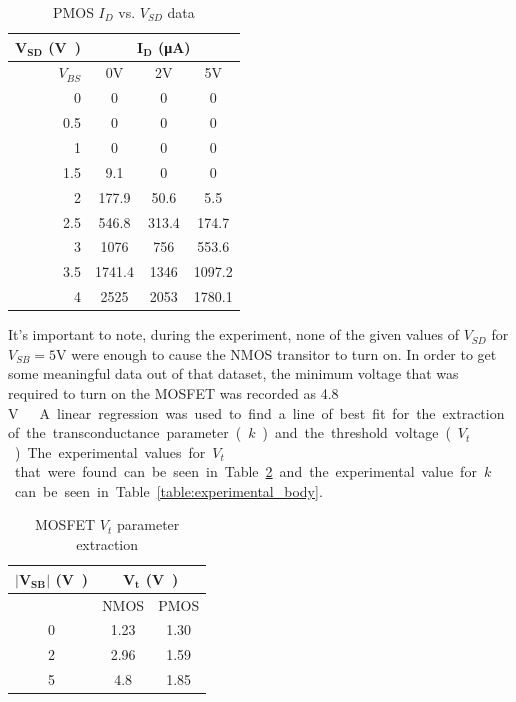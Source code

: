 \documentclass[11pt]{article}
\begin{document}
	\begin{table}[H]
		\centering
		\caption{PMOS \(I_D\) vs. \(V_{SD}\) data}
		\label{table:pmos_vt}
		\begin{tabular}{|r||c|c|c|}
			\hline
			{\(\mathbf{V_{SD}}\) (\si\volt)} & \multicolumn{3}{|c|}{\(\mathbf{I_D}\) (\si{\micro\ampere})}\\
			\hline
			\(V_{BS}\) & 0\si{\volt} & 2\si{\volt} & 5\si{\volt}\\
			\hline
			0 & 0 & 0 & 0\\
			0.5 & 0 & 0 & 0\\
			1 & 0 & 0 & 0\\
			1.5 & 9.1 & 0 & 0\\
			2 & 177.9 & 50.6 & 5.5\\
			2.5 & 546.8 & 313.4 & 174.7\\
			3 & 1076 & 756 & 553.6\\
			3.5 & 1741.4 & 1346 & 1097.2\\
			4 & 2525 & 2053 & 1780.1\\
			\hline
		\end{tabular}
	\end{table}
	
	It's important to note, during the experiment, none of the given values of 
	\(V_{SD}\) for \(V_{SB} = 5 \si\volt\) were enough to cause the NMOS transitor to turn on. In order to 
	get some meaningful data out of that dataset, the minimum voltage that was
	required to turn on the MOSFET was recorded as 4.8 \si\volt. 

	\hfill \break

	A linear regression was used to find a line of best fit for the extraction
	of the transconductance parameter (\(k\)) and the threshold voltage (\(V_t\)).
	The experimental values for \(V_t\) that were found can be seen in Table
	\ref{table:experimental_vt} and the experimental value for \(k\) can
	be seen in Table \ref{table:experimental_body}.

	\begin{table}[H]
		\centering
		\caption{MOSFET \(V_t\) parameter extraction}
		\label{table:experimental_vt}
		\begin{tabular}{|c|c|c|}
			\hline
			\(\mathbf{|V_{SB}|}\) (\si\volt) & \multicolumn{2}{|c|}{\(\mathbf{V_t}\) (\si\volt)}\\
			\hline
			& NMOS & PMOS\\
			\hline
			0 & 1.23 & 1.30\\
			2 & 2.96 & 1.59\\
			5 & 4.8 & 1.85\\
			\hline
		\end{tabular}
	\end{table}
\end{document}
